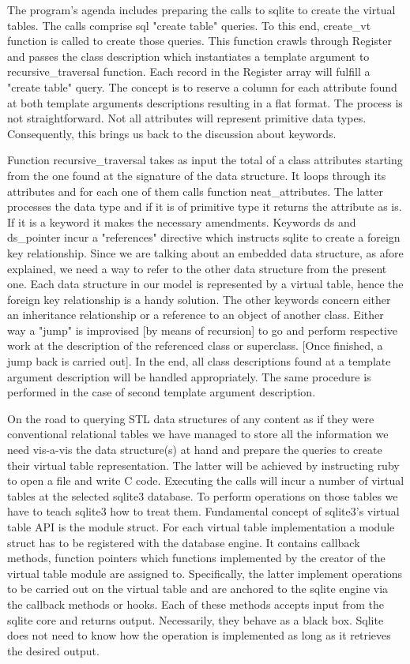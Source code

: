 \documentclass[pdftex, 11pt, a4paper]{report}
\begin{document}
\par
The program's agenda includes preparing the calls to sqlite to create the virtual tables. The calls comprise sql "create table" queries. To this end, create\_vt function is called to create those queries. This function crawls through Register and passes the class description which instantiates a template argument to recursive\_traversal function. Each record in the Register array will fulfill a "create table" query. The concept is to reserve a column for each attribute found at both template arguments descriptions resulting in a flat format. The process is not straightforward. Not all attributes will represent primitive data types. Consequently, this brings us back to the discussion about keywords.
\par
Function recursive\_traversal takes as input the total of a class attributes starting from the one found at the signature of the data structure. It loops through its attributes and for each one of them calls function neat\_attributes. The latter processes the data type and if it is of primitive type it returns the attribute as is. If it is a keyword it makes the necessary amendments. Keywords ds and ds\_pointer incur a "references" directive which instructs sqlite to create a foreign key relationship. Since we are talking about an embedded data structure, as afore explained, we need a way to refer to the other data structure from the present one. Each data structure in our model is represented by a virtual table, hence the foreign key relationship is a handy solution. The other keywords concern either an inheritance relationship or a reference to an object of another class. Either way a "jump" is improvised [by means of recursion] to go and perform respective work at the description of the referenced class or superclass. [Once finished, a jump back is carried out]. In the end, all class descriptions found at a template argument description will be handled appropriately. The same procedure is performed in the case of second template argument description.
\par
On the road to querying STL data structures of any content as if they were conventional relational tables we have managed to store all the information we need vis-a-vis the data structure(s) at hand and prepare the queries to create their virtual table representation. The latter will be achieved by instructing ruby to open a file and write C code. Executing the calls will incur a number of virtual tables at the selected sqlite3 database. To perform operations on those tables we have to teach sqlite3 how to treat them. Fundamental concept of sqlite3's virtual table API is the module struct. For each virtual table implementation a module struct has to be registered with the database engine. It contains callback methods, function pointers which functions implemented by the creator of the virtual table module are assigned to. Specifically, the latter implement operations to be carried out on the virtual table and are anchored to the sqlite engine via the callback methods or hooks. Each of these methods accepts input from the sqlite core and returns output. Necessarily, they behave as a black box. Sqlite does not need to know how the operation is implemented as long as it retrieves the desired output. 
\end{document}
